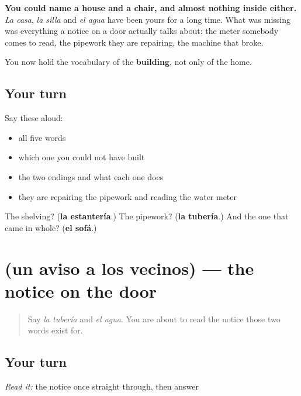 \begin{grammarlens}[title={What you've built}]
\textbf{You could name a house and a chair, and almost nothing inside either.} \emph{La casa}, \emph{la silla} and \emph{el agua} have been yours for a long time. What was missing was everything a notice on a door actually talks about: the meter somebody comes to read, the pipework they are repairing, the machine that broke.

You now hold the vocabulary of the \textbf{building}, not only of the home.
\end{grammarlens}

\subsection*{Your turn}
Say these aloud:

\begin{itemize}
\raggedright
  \item all five words
  \item which one you could not have built
  \item the two endings and what each one does
  \item they are repairing the pipework and reading the water meter
\end{itemize}

\begin{tcolorbox}[breakable,colback=teal!4,colframe=teal!35!black,title={Before you move on}]
The shelving? (\textbf{la estantería}.) The pipework? (\textbf{la tubería}.) And the one that came in whole? (\textbf{el sofá}.)
\end{tcolorbox}
\section[Practice]{(un aviso a los vecinos) — the notice on the door}

\label{lesson:ES-C432-sintesis-aviso}



\begin{quote}
Say \emph{la tubería} and \emph{el agua}. You are about to read the notice those two words exist for.
\end{quote}

\subsection*{Your turn}
\emph{Read it:} the notice once straight through, then answer

